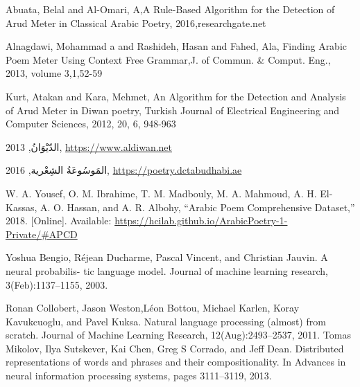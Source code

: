 \begin{thebibliography}{999}
Abuata, Belal and Al-Omari‏, A,A Rule-Based Algorithm for the Detection of Arud Meter in Classical Arabic Poetry, 2016‏,researchgate.net‏

 Alnagdawi, Mohammad a and Rashideh, Hasan and Fahed, Ala, Finding Arabic Poem Meter Using Context Free Grammar,J. of Commun. {\&} Comput. Eng., 2013, volume  3,1,52-59

 Kurt, Atakan and Kara, Mehmet, An Algorithm for the Detection and Analysis of Arud Meter in Diwan poetry, Turkish Journal of Electrical Engineering and Computer Sciences, 2012, 20, 6, 948-963




 \textarabic{الدّيْوَانُ}, 2013, \url{https://www.aldiwan.net}

\textarabic{المَوسُوعَةُ الشِعْرية}, 2016, \url{https://poetry.dctabudhabi.ae}

 W. A. Yousef, O. M. Ibrahime, T. M. Madbouly, M. A. Mahmoud, A. H. El-Kassas, A. O. Hassan, and A. R. Albohy, “Arabic Poem Comprehensive Dataset,” 2018. [Online]. Available: \url{https://hcilab.github.io/ArabicPoetry-1-Private/\#APCD}

    Yoshua Bengio, Réjean Ducharme,
Pascal Vincent, and Christian Jauvin. A neural probabilis-
tic language model. Journal of machine learning research,
3(Feb):1137–1155, 2003.

 Ronan Collobert, Jason Weston,Léon Bottou, Michael Karlen, Koray Kavukcuoglu, and Pavel Kuksa. Natural language processing (almost) from scratch. Journal of Machine Learning Research, 12(Aug):2493–2537, 2011.
 Tomas Mikolov, Ilya Sutskever, Kai Chen, Greg S Corrado, and Jeff Dean. Distributed representations of words and phrases and their compositionality. In Advances in neural information processing systems, pages 3111–3119, 2013.


\end{thebibliography}
